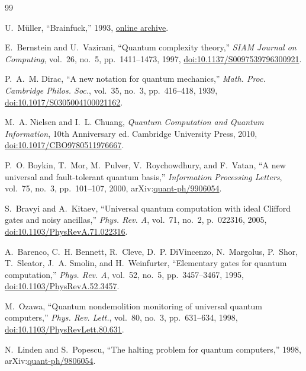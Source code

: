 \documentclass[11pt,a4paper,twocolumn]{article}
\begin{document}
\begin{thebibliography}{99}

U.~M{\"u}ller, ``Brainfuck,'' 1993, \href{https://en.wikipedia.org/wiki/Brainfuck}{online archive}.

E.~Bernstein and U.~Vazirani, ``Quantum complexity theory,'' \emph{SIAM Journal on Computing}, vol.~26, no.~5, pp.~1411--1473, 1997, \href{https://doi.org/10.1137/S0097539796300921}{doi:10.1137/S0097539796300921}.

P.~A.~M. Dirac, ``A new notation for quantum mechanics,'' \emph{Math. Proc. Cambridge Philos. Soc.}, vol.~35, no.~3, pp.~416--418, 1939, \href{https://doi.org/10.1017/S0305004100021162}{doi:10.1017/S0305004100021162}.

M.~A. Nielsen and I.~L. Chuang, \emph{Quantum Computation and Quantum Information}, 10th Anniversary ed. Cambridge University Press, 2010, \href{https://doi.org/10.1017/CBO9780511976667}{doi:10.1017/CBO9780511976667}.

P.~O. Boykin, T.~Mor, M.~Pulver, V.~Roychowdhury, and F.~Vatan, ``A new universal and fault-tolerant quantum basis,'' \emph{Information Processing Letters}, vol.~75, no.~3, pp.~101--107, 2000, arXiv:\href{https://arxiv.org/abs/quant-ph/9906054}{quant-ph/9906054}.

S.~Bravyi and A.~Kitaev, ``Universal quantum computation with ideal Clifford gates and noisy ancillas,'' \emph{Phys. Rev. A}, vol.~71, no.~2, p.~022316, 2005, \href{https://doi.org/10.1103/PhysRevA.71.022316}{doi:10.1103/PhysRevA.71.022316}.

A.~Barenco, C.~H. Bennett, R.~Cleve, D.~P. DiVincenzo, N.~Margolus, P.~Shor, T.~Sleator, J.~A. Smolin, and H.~Weinfurter, ``Elementary gates for quantum computation,'' \emph{Phys. Rev. A}, vol.~52, no.~5, pp.~3457--3467, 1995, \href{https://doi.org/10.1103/PhysRevA.52.3457}{doi:10.1103/PhysRevA.52.3457}.

M.~Ozawa, ``Quantum nondemolition monitoring of universal quantum computers,'' \emph{Phys. Rev. Lett.}, vol.~80, no.~3, pp.~631--634, 1998, \href{https://doi.org/10.1103/PhysRevLett.80.631}{doi:10.1103/PhysRevLett.80.631}.

N.~Linden and S.~Popescu, ``The halting problem for quantum computers,'' 1998, arXiv:\href{https://arxiv.org/abs/quant-ph/9806054}{quant-ph/9806054}.


\end{thebibliography}
\end{document}
